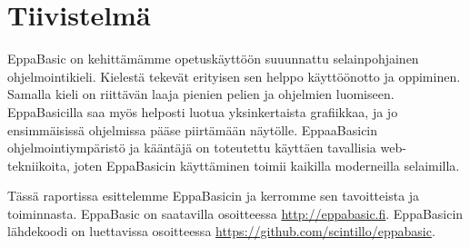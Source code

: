 
\section*{Tiivistelmä}
EppaBasic on kehittämämme opetuskäyttöön suuunnattu
selainpohjainen ohjelmointikieli.
Kielestä tekevät
erityisen sen helppo käyttöönotto
ja oppiminen.
Samalla kieli on riittävän
laaja pienien pelien ja ohjelmien luomiseen.
EppaBasicilla saa myös helposti luotua
yksinkertaista grafiikkaa,
ja jo ensimmäisissä
ohjelmissa pääse piirtämään näytölle.
EppaaBasicin ohjelmointiympäristö ja kääntäjä
on toteutettu käyttäen tavallisia
web-tekniikoita, joten EppaBasicin
käyttäminen toimii kaikilla moderneilla selaimilla.

Tässä raportissa esittelemme EppaBasicin
ja kerromme sen tavoitteista ja toiminnasta.
EppaBasic on saatavilla osoitteessa \url{http://eppabasic.fi}.
EppaBasicin lähdekoodi on luettavissa
osoitteessa \url{https://github.com/scintillo/eppabasic}.